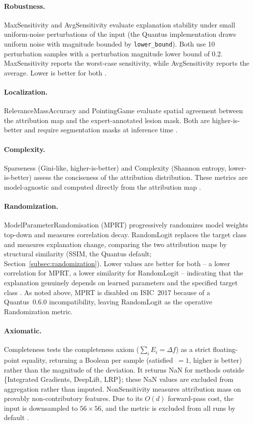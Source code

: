 \paragraph{Robustness.}
MaxSensitivity and AvgSensitivity evaluate explanation stability under
small uniform-noise perturbations of the input (the Quantus implementation
draws uniform noise with magnitude bounded by \texttt{lower\_bound}). Both
use 10 perturbation samples
with a perturbation magnitude lower bound of 0.2. MaxSensitivity reports
the worst-case sensitivity, while AvgSensitivity reports the average.
Lower is better for both \cite{hedstrom2023quantus}.

\paragraph{Localization.}
RelevanceMassAccuracy and PointingGame evaluate spatial agreement between
the attribution map and the expert-annotated lesion mask. Both are
higher-is-better and require segmentation masks at inference time
\cite{hedstrom2023quantus}.

\paragraph{Complexity.}
Sparseness (Gini-like, higher-is-better) and Complexity (Shannon entropy,
lower-is-better) assess the conciseness of the attribution distribution.
These metrics are model-agnostic and computed directly from the attribution
map \cite{hedstrom2023quantus}.

\paragraph{Randomization.}
ModelParameterRandomisation (MPRT) progressively randomizes model weights
top-down and measures correlation decay. RandomLogit replaces the target
class and measures explanation change, comparing the two attribution maps by
structural similarity (SSIM, the Quantus default;
Section~\ref{subsec:randomization}). Lower values are better for both -- a
lower correlation for MPRT, a lower similarity for RandomLogit -- indicating
that the explanation genuinely depends on learned parameters and the
specified target class \cite{hedstrom2023quantus}. As noted above, MPRT
is disabled on ISIC~2017 because of a Quantus~0.6.0 incompatibility, leaving
RandomLogit as the operative Randomization metric.

\paragraph{Axiomatic.}
Completeness tests the completeness axiom
($\sum_i E_i = \Delta f$) as a strict floating-point equality, returning a
Boolean per sample (satisfied~$=1$, higher is better) rather than the
magnitude of the deviation. It returns NaN for methods outside
\{Integrated Gradients, DeepLift, LRP\}; these NaN values are excluded
from aggregation rather than imputed. NonSensitivity measures attribution
mass on provably non-contributory features. Due to its $O(d)$ forward-pass
cost, the input is downsampled to $56 \times 56$, and the metric is
excluded from all runs by default \cite{hedstrom2023quantus}.

